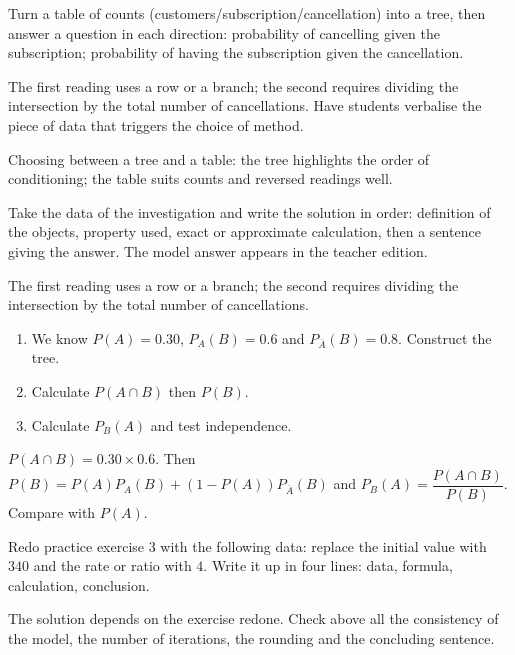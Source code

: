 \begin{activity}
Turn a table of counts (customers/subscription/cancellation) into a tree, then answer a question in each direction: probability of cancelling given the subscription; probability of having the subscription given the cancellation.

\end{activity}
\begin{solution}The first reading uses a row or a branch; the second requires dividing the intersection by the total number of cancellations. Have students verbalise the piece of data that triggers the choice of method.\end{solution}

\begin{summary}Choosing between a tree and a table: the tree highlights the order of conditioning; the table suits counts and reversed readings well.\end{summary}

\begin{example}
Take the data of the investigation and write the solution in order: definition of the objects, property used, exact or approximate calculation, then a sentence giving the answer. The model answer appears in the teacher edition.
\end{example}
\begin{solution}The first reading uses a row or a branch; the second requires dividing the intersection by the total number of cancellations.\end{solution}

\begin{exercise}[essential]
\begin{enumerate}\item We know $P(A)=\num{0,30}$, $P_A(B)=\num{0,6}$ and $P_{\overline A}(B)=\num{0,8}$. Construct the tree.\item Calculate $P(A\cap B)$ then $P(B)$.\item Calculate $P_B(A)$ and test independence.\end{enumerate}
\end{exercise}
\begin{solution}$P(A\cap B)=\num{0,30}\times\num{0,6}$. Then $P(B)=P(A)P_A(B)+(1-P(A))P_{\overline A}(B)$ and $P_B(A)=\dfrac{P(A\cap B)}{P(B)}$. Compare with $P(A)$.\end{solution}


\begin{homework}Redo practice exercise 3 with the following data: replace the initial value with $340$ and the rate or ratio with $4$. Write it up in four lines: data, formula, calculation, conclusion.\end{homework}
\begin{solution}The solution depends on the exercise redone. Check above all the consistency of the model, the number of iterations, the rounding and the concluding sentence.\end{solution}

